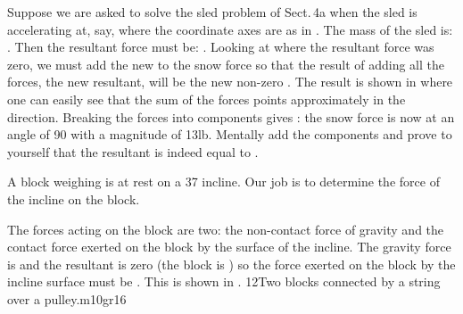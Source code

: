 {
Suppose we are asked to solve the sled problem of Sect.\,4a when the
sled is accelerating at, say,  where
the coordinate axes are as in .
The mass of the sled is: .  Then the resultant force must be:
.
Looking at  where the resultant force was zero, we must add
the new  to the snow force so that the result of adding
all the forces, the new resultant, will be the new non-zero .
The result is shown in  where one can easily see that the sum
of the forces points approximately in the  direction.
Breaking the forces into components gives : the snow
force is now at an angle of {90\degrees} with a magnitude of
13\unit{lb}.
Mentally add the components and prove to yourself that the resultant is
indeed equal to .

A block weighing  is at rest on a {37\degrees} incline.
Our job is to determine the force of the incline on the block.

The forces acting on the block are two: the non-contact force of gravity
and the contact force exerted on the block by the surface of the incline.
The gravity force is  and the
resultant is zero (the block is ) so the force exerted on the
block by the incline surface must be .
This is shown in .
%
                          {12}{Two blocks connected by a string over a pulley.}{m10gr16}
%
}%
%
